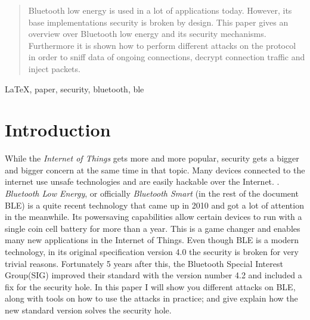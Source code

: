 \documentclass[conference]{IEEEtran}
\begin{document}
\begin{abstract}
Bluetooth low energy is used in a lot of applications today. However, its base implementations security is broken by design. This paper gives an overview over Bluetooth low energy and its security mechanisms. Furthermore it is shown how to perform different attacks on the protocol in order to sniff data of ongoing connections, decrypt connection traffic and inject packets.
\end{abstract}

\begin{IEEEkeywords}
\LaTeX, paper, security, bluetooth, ble
\end{IEEEkeywords}






%
\IEEEpeerreviewmaketitle



\section{Introduction}
While the \emph{Internet of Things} gets more and more popular, security gets a bigger and bigger concern at the same time in that topic. Many devices connected to the internet use unsafe technologies and are easily hackable over the Internet. \cite{iotsecanalysis}. \emph{Bluetooth Low Energy}, or officially \emph{Bluetooth Smart} (in the rest of the document BLE) is a quite recent technology that came up in 2010 and got a lot of attention in the meanwhile. Its powersaving capabilities allow certain devices to run with a single coin cell battery for more than a year\cite{blelowpower}. This is a game changer and enables many new applications in the Internet of Things. Even though BLE is a modern technology, in its original specification version 4.0 the security is broken for very trivial reasons. Fortunately 5 years after this, the Bluetooth Special Interest Group(SIG) improved their standard with the version number 4.2 and included a fix for the security hole. \cite{ble42}\cite{ble42announcement} In this paper I will show you different attacks on BLE, along with tools on how to use the attacks in practice; and give explain how the new standard version solves the security hole.
\end{document}
